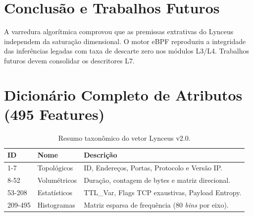 \documentclass[11pt,a4paper]{article}
\begin{document}
\section{Conclusão e Trabalhos Futuros}
A varredura algorítmica comprovou que as premissas extrativas do Lynceus independem da saturação dimensional. O motor eBPF reproduziu a integridade das inferências legadas com taxa de descarte zero nos módulos L3/L4. Trabalhos futuros devem consolidar os descritores L7.

\appendix
\section{Dicionário Completo de Atributos (495 Features)}
\begin{table}[H]
\centering
\begin{tabular}{lll}
\toprule
\textbf{ID} & \textbf{Nome} & \textbf{Descrição} \\
\midrule
1-7 & Topológicos & ID, Endereços, Portas, Protocolo e Versão IP. \\
8-52 & Volumétricos & Duração, contagem de bytes e matriz direcional. \\
53-208 & Estatísticos & TTL\_Var, Flags TCP exaustivas, Payload Entropy. \\
209-495 & Histogramas & Matriz esparsa de frequência (80 \textit{bins} por eixo). \\
\bottomrule
\end{tabular}
\caption{Resumo taxonômico do vetor Lynceus v2.0.}
\end{table}
\end{document}
